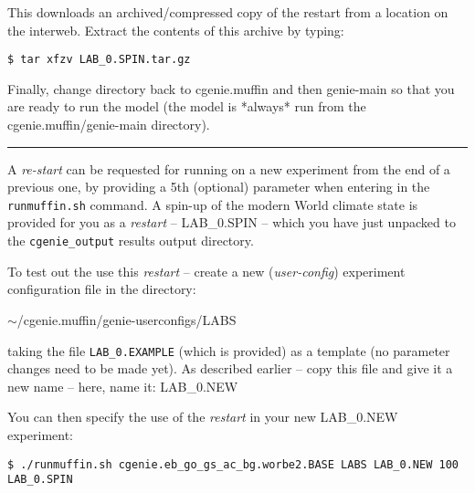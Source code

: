 \documentclass[11pt,fleqn]{book} %
\begin{document}
This downloads an archived/compressed copy of the restart from a location on the interweb. Extract the contents of this archive by typing:

\vspace{-2mm}
\begin{verbatim}
$ tar xfzv LAB_0.SPIN.tar.gz
\end{verbatim}
\vspace{-2mm}

Finally, change directory back to \textsf{\footnotesize cgenie.muffin} and then \textsf{\footnotesize genie-main} so that you are ready to run the model (the model is *always* run from the \textsf{\footnotesize cgenie.muffin/genie-main} directory).

\vspace{1mm}
\noindent\rule{4cm}{0.1mm}
\vspace{2mm}

\noindent A \textit{re-start} can be requested for  running on a new experiment from the end of a previous one, by providing a 5th   (optional) parameter when entering in the \texttt{runmuffin.sh} command. A spin-up of the modern World climate state is provided for you as a \textit{restart} -- \textsf{\footnotesize LAB\_0.SPIN} -- which you have just unpacked to the \texttt{cgenie\_output} results output directory.

To test out the use this \textit{restart} -- create a new (\textit{user-config}) experiment configuration file in the directory: 

\vspace{1mm}
\textsf{\footnotesize \(\sim\)/cgenie.muffin/genie-userconfigs/LABS}
\vspace{1mm}

\noindent taking the file \texttt{LAB\_0.EXAMPLE} (which is provided) as a template (no parameter changes need to be made yet). As described earlier -- copy this file and give it a new name -- here, name it: \textsf{\footnotesize LAB\_0.NEW}

\vspace{1mm}
You can then specify the use of the \textit{restart} in your new \textsf{\footnotesize LAB\_0.NEW} experiment:

\vspace{-2mm}
\small\begin{verbatim}
$ ./runmuffin.sh cgenie.eb_go_gs_ac_bg.worbe2.BASE LABS LAB_0.NEW 100 LAB_0.SPIN
\end{verbatim}\normalsize
\vspace{-2mm}
\end{document}
